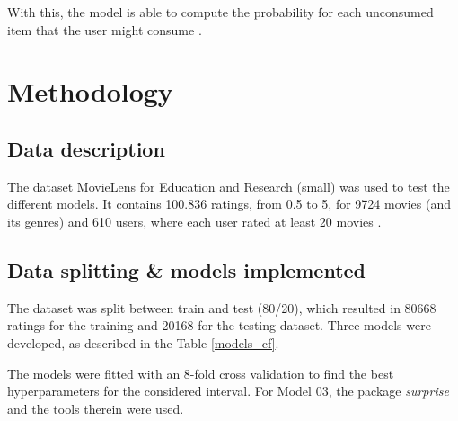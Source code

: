 \documentclass[conference]{IEEEtran}
\begin{document}
With this, the model is able to compute the probability for each unconsumed item that the user might consume \cite{gopalan2014scalablerecommendationpoissonfactorization}.

\section{Methodology}

\subsection{Data description}

The dataset MovieLens for Education and Research (small) was used to test the different models. It contains 100.836 ratings, from 0.5 to 5, for 9724 movies (and its genres) and 610 users, where each user rated at least 20 movies \cite{MovieLens}.

\subsection{Data splitting \& models implemented}

The dataset was split between train and test (80/20), which resulted in 80668 ratings for the training and 20168 for the testing dataset. Three models were developed, as described in the Table \ref{models_cf}.

\begin{table}[H]
\centering
\caption{Models implemented to the MovieLens dataset.}
\label{models_cf}
\end{table}

The models were fitted with an 8-fold cross validation to find the best hyperparameters for the considered interval. For Model 03, the package \textit{surprise} and the tools therein \cite{surprise} were used. 
\end{document}
